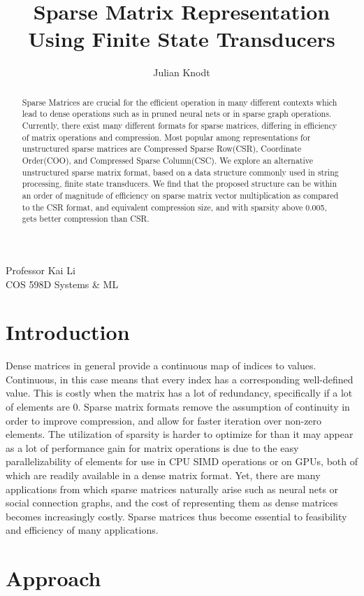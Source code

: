 \documentclass[12pt]{article}
\title{\vspace{-1cm}Sparse Matrix Representation Using Finite State Transducers}
\author{\vspace{-1cm}Julian Knodt}
\begin{document}
\maketitle
Professor Kai Li \\
COS 598D Systems \& ML

\begin{abstract}
Sparse Matrices are crucial for the efficient operation in many different contexts which lead to
dense operations such as in pruned neural nets or in sparse graph operations. Currently, there
exist many different formats for sparse matrices, differing in efficiency of matrix operations
and compression. Most popular among representations for unstructured sparse matrices are
Compressed Sparse Row(CSR), Coordinate Order(COO), and Compressed Sparse Column(CSC). We explore
an alternative unstructured sparse matrix format, based on a data structure commonly used in
string processing, finite state transducers. We find that the proposed structure can be within
an order of magnitude of efficiency on sparse matrix vector multiplication as compared to the
CSR format, and equivalent compression size, and with sparsity above 0.005, gets better
compression than CSR.
\end{abstract}

\section*{Introduction}
Dense matrices in general provide a continuous map of indices to values. Continuous, in this
case means that every index has a corresponding well-defined value. This is costly when the matrix has a
lot of redundancy, specifically if a lot of elements are $0$. Sparse matrix formats remove the assumption
of continuity in order to improve compression, and allow for faster iteration over non-zero
elements. The utilization of sparsity is harder to optimize for than it may appear as a lot of
performance gain for matrix operations is due to the easy parallelizability of elements for use
in CPU SIMD operations or on GPUs, both of which are readily available in a dense matrix
format. Yet, there are many applications from which sparse matrices naturally arise such as
neural nets or social connection graphs, and the cost of representing them as dense matrices
becomes increasingly costly. Sparse matrices thus become essential to feasibility and efficiency
of many applications.

\section*{Approach}
\end{document}
